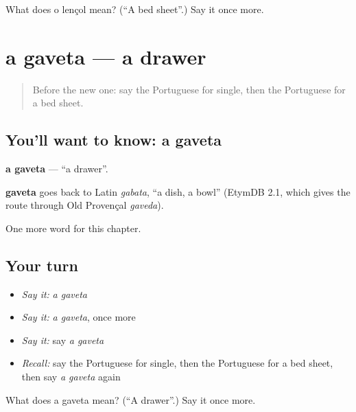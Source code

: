 \begin{tcolorbox}[breakable,colback=teal!4,colframe=teal!35!black,title={Before you move on}]
What does o lençol mean? (\textquotedblleft{}A bed sheet\textquotedblright{}.) Say it once more.
\end{tcolorbox}
\section[a gaveta]{a gaveta — a drawer}

\label{lesson:PT-C188-gaveta}



\begin{quote}
Before the new one: say the Portuguese for single, then the Portuguese for a bed sheet.
\end{quote}

\subsection*{You'll want to know: a gaveta}
\textbf{a gaveta} — \textquotedblleft{}a drawer\textquotedblright{}.

\begin{cousinweb}
\textbf{gaveta} goes back to Latin \emph{gabata}, \textquotedblleft{}a dish, a bowl\textquotedblright{} (EtymDB 2.1, which gives the route through Old Provençal \emph{gaveda}).
\end{cousinweb}

\begin{grammarlens}[title={What you've built}]
One more word for this chapter.
\end{grammarlens}

\subsection*{Your turn}
\begin{itemize}
\raggedright
  \item \emph{Say it:} \emph{a gaveta}
  \item \emph{Say it:} \emph{a gaveta}, once more
  \item \emph{Say it:} say \emph{a gaveta}
  \item \emph{Recall:} say the Portuguese for single, then the Portuguese for a bed sheet, then say \emph{a gaveta} again
\end{itemize}

\begin{tcolorbox}[breakable,colback=teal!4,colframe=teal!35!black,title={Before you move on}]
What does a gaveta mean? (\textquotedblleft{}A drawer\textquotedblright{}.) Say it once more.
\end{tcolorbox}
